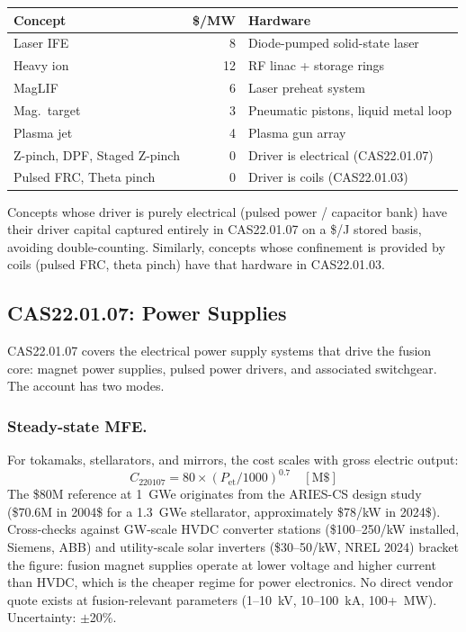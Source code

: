 \documentclass{article}
\begin{document}
\begin{center}
\begin{tabular}{lrl}
\toprule
Concept & \$/MW & Hardware \\
\midrule
Laser IFE   &  8 & Diode-pumped solid-state laser \\
Heavy ion   & 12 & RF linac + storage rings \\
MagLIF      &  6 & Laser preheat system \\
Mag.\ target &  3 & Pneumatic pistons, liquid metal loop \\
Plasma jet  &  4 & Plasma gun array \\
\midrule
Z-pinch, DPF, Staged Z-pinch & 0 & Driver is electrical (CAS22.01.07) \\
Pulsed FRC, Theta pinch       & 0 & Driver is coils (CAS22.01.03) \\
\bottomrule
\end{tabular}
\end{center}

Concepts whose driver is purely electrical (pulsed power / capacitor
bank) have their driver capital captured entirely in CAS22.01.07 on a
\$/J stored basis, avoiding double-counting.  Similarly, concepts
whose confinement is provided by coils (pulsed FRC, theta pinch) have
that hardware in CAS22.01.03.

\subsection{CAS22.01.07: Power Supplies}
\label{sec:cas2207}

CAS22.01.07 covers the electrical power supply systems that drive the
fusion core: magnet power supplies, pulsed power drivers, and associated
switchgear.  The account has two modes.

\subsubsection{Steady-state MFE.}
For tokamaks, stellarators, and mirrors, the cost scales with gross
electric output:
\begin{equation}
  C_{220107} = 80 \times (P_{\text{et}} / 1000)^{0.7} \quad [\text{M\$}]
\end{equation}
The \$80M reference at 1~GWe originates from the ARIES-CS design study
(\$70.6M in 2004\$ for a 1.3~GWe stellarator, approximately \$78/kW in
2024\$).  Cross-checks against GW-scale HVDC converter stations
(\$100--250/kW installed, Siemens, ABB) and utility-scale solar inverters
(\$30--50/kW, NREL 2024) bracket the figure: fusion magnet supplies
operate at lower voltage and higher current than HVDC, which is the
cheaper regime for power electronics.  No direct vendor quote exists at
fusion-relevant parameters (1--10~kV, 10--100~kA, 100+~MW).
Uncertainty: $\pm$20\%.
\end{document}
